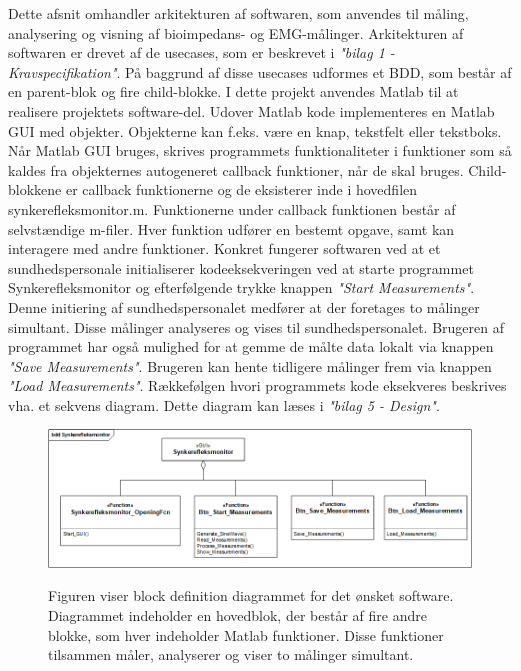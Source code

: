 Dette afsnit omhandler arkitekturen af softwaren, som anvendes til måling, analysering og visning af bioimpedans- og EMG-målinger. Arkitekturen af softwaren er drevet af de usecases, som er beskrevet i \textit{"bilag 1 - Kravspecifikation"}. På baggrund af disse usecases udformes et BDD, som består af en parent-blok og fire child-blokke. I dette projekt anvendes  Matlab til at realisere projektets  software-del. Udover Matlab kode implementeres en Matlab GUI med objekter. Objekterne kan f.eks. være en knap, tekstfelt eller tekstboks. Når Matlab GUI bruges, skrives programmets funktionaliteter i funktioner som så kaldes fra objekternes autogeneret callback funktioner, når de skal bruges. Child-blokkene er callback funktionerne og de eksisterer inde i hovedfilen synkerefleksmonitor.m. Funktionerne under callback funktionen består af selvstændige m-filer. Hver funktion udfører en bestemt opgave, samt kan interagere med andre funktioner. Konkret fungerer softwaren ved at et sundhedspersonale initialiserer kodeeksekveringen ved at starte programmet Synkerefleksmonitor og efterfølgende trykke knappen \textit{"Start Measurements"}. Denne initiering af sundhedspersonalet medfører at der foretages to målinger simultant. Disse målinger analyseres og vises til sundhedspersonalet. Brugeren af programmet har også mulighed for at gemme de målte data lokalt via knappen \textit{"Save Measurements"}. Brugeren kan hente tidligere  målinger frem via knappen \textit{"Load Measurements"}. Rækkefølgen hvori programmets kode eksekveres beskrives vha. et sekvens diagram. Dette diagram kan læses i \textit{"bilag 5 - Design"}.    

\begin{figure}[H] 
\centering
{\includegraphics[width=\linewidth]
{Figure/SWIBD}}
\caption{Figuren viser block definition diagrammet for det ønsket software. Diagrammet indeholder en hovedblok, der består af fire andre blokke, som hver indeholder Matlab funktioner. Disse funktioner tilsammen måler, analyserer og viser to målinger simultant.}
\label{figScrip}
\end{figure}



%
